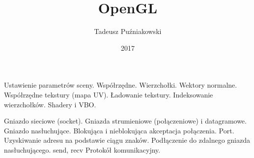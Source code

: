 \documentclass{beamer}
\title[SGD 4]{OpenGL}
\author{Tadeusz Puźniakowski}
\institute{PJATK}
\date{2017}
\begin{document}
\frame{\titlepage}


\begin{frame}[fragile]
		\BI
		\I Ustawienie parametrów sceny.
		\I Współrzędne.
		\I Wierzchołki.
		\I Wektory normalne.
		\I Współrzędne tekstury (mapa UV).
		\I Ładowanie tekstury.
		\I Indeksowanie wierzchołków.
		\I Shadery i VBO.
		\EI
	\EB
\end{frame}

\begin{frame}[fragile]
		\BI
		\I Gniazdo sieciowe (socket).
		\I Gniazda strumieniowe (połączeniowe) i datagramowe.
		\I Gniazdo nasłuchujące.
		\I Blokująca i nieblokująca akceptacja połączenia.
		\I Port.
		\I Uzyskiwanie adresu na podstawie ciągu znaków.
		\I Podłączenie do zdalnego gniazda nasłuchującego.
		\I send, recv
		\I Protokół komunikacyjny.
		\EI
	\EB
\end{frame}
\end{document}
